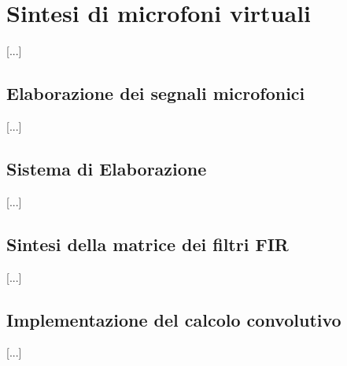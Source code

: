 \chapter{Sintesi di microfoni virtuali}
\label{sec:virtualmikes}
[...]\\


\section{Elaborazione dei segnali microfonici}
\label{sec:}
	
	[...]\\

\section{Sistema di Elaborazione}
\label{sec:sistelab}
	
	[...]\\
	
\section{Sintesi della matrice dei filtri FIR}
\label{sec:}
	[...]\\
	
	
		
\section{Implementazione del calcolo convolutivo}
\label{sec:}
	[...]\\
	
